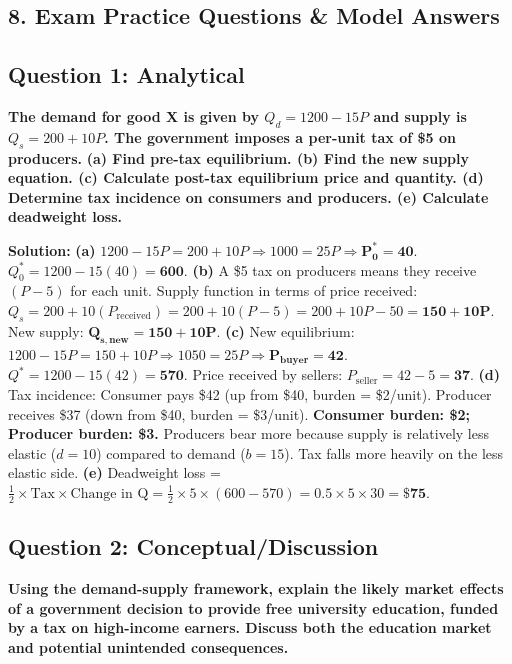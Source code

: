 \documentclass[10pt,a4paper]{article}
\begin{document}
\begin{multicols}{2}
\section*{8. Exam Practice Questions \& Model Answers}

\subsection*{Question 1: Analytical}
\textbf{The demand for good X is given by $Q_d = 1200 - 15P$ and supply is $Q_s = 200 + 10P$. The government imposes a per-unit tax of \$5 on producers.}
\textbf{(a) Find pre-tax equilibrium. (b) Find the new supply equation. (c) Calculate post-tax equilibrium price and quantity. (d) Determine tax incidence on consumers and producers. (e) Calculate deadweight loss.}

\vspace{0.1cm}
\textbf{Solution:}
\vspace{0.05cm}
\textbf{(a)} $1200 - 15P = 200 + 10P \Rightarrow 1000 = 25P \Rightarrow \mathbf{P_0^* = 40}$. $Q_0^* = 1200 - 15(40) = \mathbf{600}$.
\vspace{0.05cm}
\textbf{(b)} A \$5 tax on producers means they receive $(P - 5)$ for each unit. Supply function in terms of price received: $Q_s = 200 + 10(P_{\text{received}}) = 200 + 10(P - 5) = 200 + 10P - 50 = \mathbf{150 + 10P}$. New supply: $\mathbf{Q_{s,\text{new}} = 150 + 10P}$.
\vspace{0.05cm}
\textbf{(c)} New equilibrium: $1200 - 15P = 150 + 10P \Rightarrow 1050 = 25P \Rightarrow \mathbf{P_{\text{buyer}} = 42}$. $Q^* = 1200 - 15(42) = \mathbf{570}$. Price received by sellers: $P_{\text{seller}} = 42 - 5 = \mathbf{37}$.
\vspace{0.05cm}
\textbf{(d)} Tax incidence: Consumer pays \$42 (up from \$40, burden = \$2/unit). Producer receives \$37 (down from \$40, burden = \$3/unit). \textbf{Consumer burden: \$2; Producer burden: \$3.} Producers bear more because supply is relatively less elastic ($d=10$) compared to demand ($b=15$). Tax falls more heavily on the less elastic side.
\vspace{0.05cm}
\textbf{(e)} Deadweight loss = $\frac{1}{2} \times \text{Tax} \times \text{Change in Q} = \frac{1}{2} \times 5 \times (600 - 570) = 0.5 \times 5 \times 30 = \mathbf{\$75}$.

\vspace{0.2cm}

\subsection*{Question 2: Conceptual/Discussion}
\textbf{Using the demand-supply framework, explain the likely market effects of a government decision to provide free university education, funded by a tax on high-income earners. Discuss both the education market and potential unintended consequences.}


\end{multicols}
\end{document}
